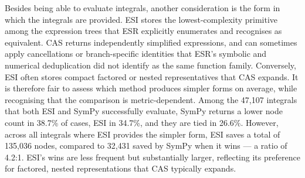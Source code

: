 \documentclass[preprint,12pt,authoryear]{elsarticle}
\newcommand{\hd}[1]{{\color{red}\textbf{[HD: #1]}}}
\begin{document}
Besides being able to evaluate integrals, another consideration is the form in which the integrals are provided.
ESI stores the lowest-complexity primitive among the expression trees that ESR explicitly enumerates and recognises as equivalent. CAS returns independently simplified expressions, and can sometimes apply cancellations or branch-specific identities that ESR's symbolic and numerical deduplication did not identify as the same function family. Conversely, ESI often stores compact factored or nested representatives that CAS expands. It is therefore fair to assess which method produces simpler forms on average, while recognising that the comparison is metric-dependent.
Among the 47{,}107 integrals that both ESI and SymPy successfully evaluate, SymPy returns a lower node count in 38.7\% of cases, ESI in 34.7\%, and they are tied in 26.6\%. However, across all integrals where ESI provides the simpler form, ESI saves a total of 135{,}036 nodes, compared to 32{,}431 saved by SymPy when it wins --- a ratio of 4.2:1. ESI's wins are less frequent but substantially larger, reflecting its preference for factored, nested representations that CAS typically expands.
\end{document}
